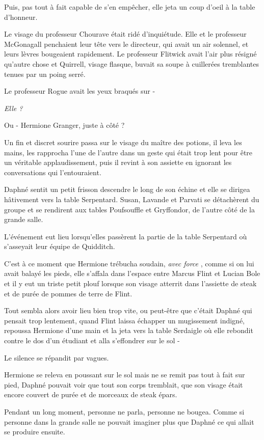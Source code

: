 Puis, pas tout à fait capable de s'en empêcher, elle jeta un coup d'oeil à la table d'honneur.

Le visage du professeur Chourave était ridé d'inquiétude. Elle et le professeur McGonagall penchaient leur tête vers le directeur, qui avait un air solennel, et leurs lèvres bougeaient rapidement. Le professeur Flitwick avait l'air plus résigné qu'autre chose et Quirrell, visage flasque, buvait sa soupe à cuillerées tremblantes tenues par un poing serré.

Le professeur Rogue avait les yeux braqués sur -

\emph{Elle ?} 

Ou - Hermione Granger, juste à côté ?

Un fin et discret sourire passa sur le visage du maître des potions, il leva les mains, les rapprocha l'une de l'autre dans un geste qui était trop lent pour être un véritable applaudissement, puis il revint à son assiette en ignorant les conversations qui l'entouraient.

Daphné sentit un petit frisson descendre le long de son échine et elle se dirigea hâtivement vers la table Serpentard. Susan, Lavande et Parvati se détachèrent du groupe et se rendirent aux tables Poufsouffle et Gryffondor, de l'autre côté de la grande salle.

L'événement eut lieu lorsqu'elles passèrent la partie de la table Serpentard où s'asseyait leur équipe de Quidditch.

C'est à ce moment que Hermione trébucha soudain, \emph{avec force} , comme si on lui avait balayé les pieds, elle s'affala dans l'espace entre Marcus Flint et Lucian Bole et il y eut un triste petit plouf lorsque son visage atterrit dans l'assiette de steak et de purée de pommes de terre de Flint.

Tout sembla alors avoir lieu bien trop vite, ou peut-être que c'était Daphné qui pensait trop lentement, quand Flint laissa échapper un mugissement indigné, repoussa Hermione d'une main et la jeta vers la table Serdaigle où elle rebondit contre le dos d'un étudiant et alla s'effondrer sur le sol -

Le silence se répandit par vagues.

Hermione se releva en poussant sur le sol mais ne se remit pas tout à fait sur pied, Daphné pouvait voir que tout son corps tremblait, que son visage était encore couvert de purée et de morceaux de steak épars.

Pendant un long moment, personne ne parla, personne ne bougea. Comme si personne dans la grande salle ne pouvait imaginer plus que Daphné ce qui allait se produire ensuite.

